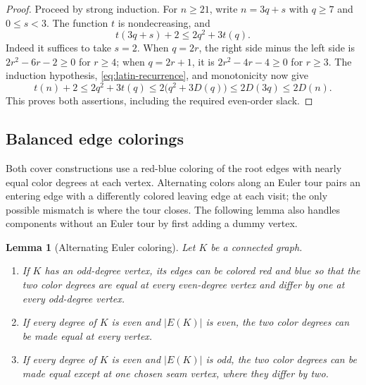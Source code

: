 \documentclass[11pt]{article}
\newtheorem{lemma}[theorem]{Lemma}
\theoremstyle{remark}
\begin{document}
\begin{proof}
Proceed by strong induction.  For $n\geq21$, write $n=3q+s$ with
$q\geq7$ and $0\leq s<3$.  The function $t$ is nondecreasing, and
\begin{equation}\label{eq:latin-arithmetic}
  t(3q+s)+2\leq2q^2+3t(q).
\end{equation}
Indeed it suffices to take $s=2$.  When $q=2r$, the right side minus
the left side is $2r^2-6r-2\geq0$ for $r\geq4$; when $q=2r+1$, it
is $2r^2-4r-4\geq0$ for $r\geq3$.  The induction hypothesis,
\eqref{eq:latin-recurrence}, and monotonicity now give
\[
  t(n)+2\leq2q^2+3t(q)
  \leq2\bigl(q^2+3D(q)\bigr)\leq2D(3q)\leq2D(n).
\]
This proves both assertions, including the required even-order slack.
\end{proof}

\subsection{Balanced edge colorings}\label{sec:color}

Both cover constructions use a red-blue coloring of the root edges with
nearly equal color degrees at each vertex.  Alternating colors along an
Euler tour pairs an entering edge with a differently colored leaving edge
at each visit; the only possible mismatch is where the tour closes.  The
following lemma also handles components without an Euler tour by first
adding a dummy vertex.

\begin{samepage}
\begin{lemma}[Alternating Euler coloring]\label{lem:euler-color}
Let $K$ be a connected graph.
\begin{enumerate}[label=\textup{(\alph*)}]
  \item If $K$ has an odd-degree vertex, its edges can be colored red and blue
        so that the two color degrees are equal at every even-degree vertex
        and differ by one at every odd-degree vertex.
  \item If every degree of $K$ is even and $|E(K)|$ is even, the two color
        degrees can be made equal at every vertex.
  \item If every degree of $K$ is even and $|E(K)|$ is odd, the two color
        degrees can be made equal except at one chosen seam vertex, where they
        differ by two.
\end{enumerate}
\end{lemma}
\end{samepage}
\end{document}
